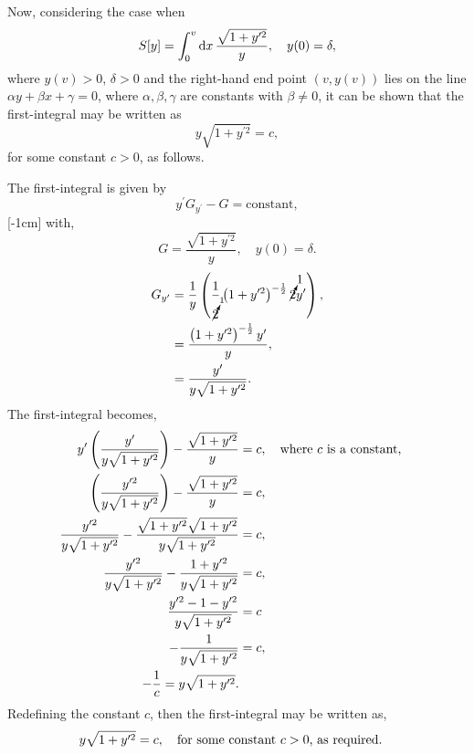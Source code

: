 Now, considering the case when
\[
	S[y] = \int_{0}^{v}\mathrm{d} x\,\frac{\sqrt{1+y^{\prime2}}}{y},\quad y(0)=\delta,
\]
where $y(v)>0$, $\delta>0$ and the right-hand end point $(v,y(v))$ lies on the line $\alpha y+\beta x + \gamma = 0$, where $\alpha, \beta, \gamma$ are constants with $\beta\ne 0$, it can be shown that the first-integral may be written as
\begin{equation}
	\label{eq:4.15}
	y\sqrt{1+y^{\prime2}}=c,
\end{equation}
for some constant $c>0$, as follows.

The first-integral is given by \[y^\prime G_{y^\prime} - G = \text{constant},\][-1cm]
with,
\[
	G = \frac{\sqrt{1+y^{\prime2}}}{y},\quad y(0)=\delta.
\]
\begin{equation*}
\begin{split}
	G_{y^\prime} &= \frac{1}{y}\left(\frac{1}{\cancelto{1}{2}}\left(1+y^{\prime2}\right)^{-\frac{1}{2}}\cancelto{1}{2}y^\prime\right),\\
	&= \frac{\left(1+y^{\prime2}\right)^{-\frac{1}{2}}y^\prime}{y},\\
	&= \frac{y^\prime}{y\sqrt{1+y^{\prime2}}}.
\end{split}
\end{equation*}
The first-integral becomes,
\begin{equation*}
\begin{split}
	y^\prime \left(\frac{y^\prime}{y\sqrt{1+y^{\prime2}}}\right) - \frac{\sqrt{1+y^{\prime2}}}{y} &= c,\quad\text{where $c$ is a constant,}\quad\\
\left(\frac{y^{\prime2}}{y\sqrt{1+y^{\prime2}}}\right) - \frac{\sqrt{1+y^{\prime2}}}{y} &= c,\\
\frac{y^{\prime2}}{y\sqrt{1+y^{\prime2}}} - \frac{\sqrt{1+y^{\prime2}}\sqrt{1+y^{\prime2}}}{y\sqrt{1+y^{\prime2}}} &= c,\\
\frac{y^{\prime2}}{y\sqrt{1+y^{\prime2}}} - \frac{1+y^{\prime2}}{y\sqrt{1+y^{\prime2}}} &= c,\\
\frac{y^{\prime2} -  1 -y^{\prime2}}{y\sqrt{1+y^{\prime2}}} &= c\\
-\frac{1}{y\sqrt{1+y^{\prime2}}} &= c,\\
-\frac{1}{c} = y\sqrt{1+y^{\prime2}}.
\end{split}
\end{equation*}
Redefining the constant $c$, then the first-integral may be written as,
\begin{equation}
\label{eq:4.16}
	y\sqrt{1+y^{\prime2}} = c,\quad\text{for some constant $c>0$, as required.}\quad
\end{equation}
